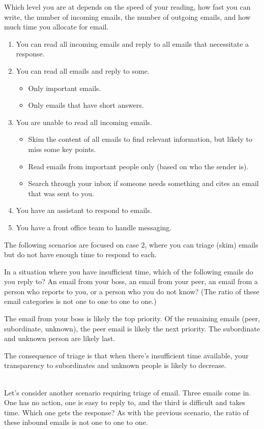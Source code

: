 Which level you are at depends on the speed of your reading, how fast you can write, the number of incoming emails, the number of outgoing emails, and how much time you allocate for email. 
\begin{enumerate}
    \item You can read all incoming emails and reply to all emails that necessitate a response.
    \item You can read all emails and reply to some. 
    \begin{itemize}
        \item Only important emails.
        \item Only emails that have short answers.
    \end{itemize}
    \item You are unable to read all incoming emails. 
    \begin{itemize}
        \item Skim the content of all emails to find relevant information, but likely to miss some key points.
        \item Read emails from important people only (based on who the sender is).
        \item Search through your inbox if someone needs something and cites an email that was sent to you.
    \end{itemize}
    \item You have an assistant to respond to emails.
    \item You have a front office team to handle messaging.
\end{enumerate}
The following scenarios are focused on case 2, where you can triage (skim) emails but do not have enough time to respond to each.


In a situation where you have insufficient time, which of the following emails do you reply to? An email from your boss, an email from your peer, an email from a person who reports to you, or a person who you do not know?
(The ratio of these email categories is not one to one to one to one.)

The email from your boss is likely the top priority. Of the remaining emails (peer, subordinate, unknown), the peer email is likely the next priority.
The subordinate and unknown person are likely last.

The consequence of triage is that when there's insufficient time available, your transparency to subordinates and unknown people is likely to decrease. 

\ \\
Let's consider another scenario requiring triage of email. Three emails come in. One has no action, one is easy to reply to, and the third is difficult and takes time. Which one gets the response?
As with the previous scenario, the ratio of these inbound emails is not one to one to one.

